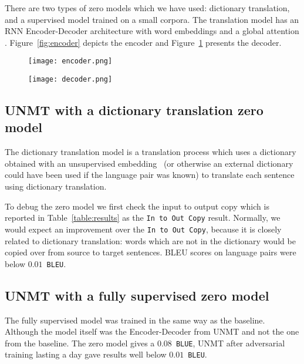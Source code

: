 \documentclass[]{article}
\begin{document}
There are two types of zero models which we have used: dictionary translation, and a supervised model trained on a small corpora.
The translation model has an RNN Encoder-Decoder architecture \citep{DBLP:journals/corr/ChoMGBSB14} with word embeddings and a global attention \citep{luong2015effective}.
Figure~\ref{fig:encoder} depicts the encoder and Figure~\ref{fig:decoder} presents the decoder.

\begin{figure}
\centering
\begin{minipage}{.5\textwidth}
  \centering
  \texttt{[image: encoder.png]}
  \label{fig:encoder}
\end{minipage}\hfill
\begin{minipage}{.5\textwidth}
  \centering
  \texttt{[image: decoder.png]}
  \label{fig:decoder}
\end{minipage}
\end{figure}

\subsection{\ac{UNMT} with a dictionary translation zero model}
\label{sect:fully_unsupervised}
The dictionary translation model is a translation process which uses a dictionary obtained with an unsupervised embedding~\citep{conneau2017word} (or otherwise an external dictionary could have been used if the language pair was known) to translate each sentence using dictionary translation.

To debug the zero model we first check the input to output copy which is reported in Table~\ref{table:results} as the {\tt In to Out Copy} result.
Normally, we would expect an improvement over the {\tt In to Out Copy}, because it is closely related to dictionary translation: words which are not in the dictionary would be copied over from source to target sentences.
BLEU scores on language pairs were below $0.01$~{\tt BLEU}.

\subsection{\ac{UNMT} with a fully supervised zero model}
\label{sect:semi_unsupervised}
The fully supervised model was trained in the same way as the baseline.
Although the model itself was the Encoder-Decoder from UNMT and not the one from the baseline.
The zero model gives a $0.08$~{\tt BLUE}, UNMT after adversarial training lasting a day gave results well below $0.01$~{\tt BLEU}.
\end{document}
